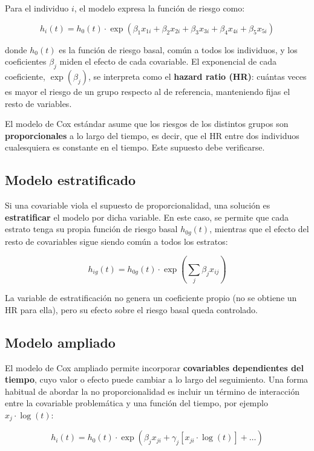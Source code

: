 \documentclass[
]{article}
\begin{document}
Para el individuo \(i\), el modelo expresa la función de riesgo como:

\[h_i(t) = h_0(t) \cdot \exp\left(\beta_1 x_{1i} + \beta_2 x_{2i} + \beta_3 x_{3i} + \beta_4 x_{4i} + \beta_5 x_{5i}\right)\]

donde \(h_0(t)\) es la función de riesgo basal, común a todos los
individuos, y los coeficientes \(\beta_j\) miden el efecto de cada
covariable. El exponencial de cada coeficiente, \(\exp(\beta_j)\), se
interpreta como el \textbf{hazard ratio (HR)}: cuántas veces es mayor el
riesgo de un grupo respecto al de referencia, manteniendo fijas el resto
de variables.

El modelo de Cox estándar asume que los riesgos de los distintos grupos
son \textbf{proporcionales} a lo largo del tiempo, es decir, que el HR
entre dos individuos cualesquiera es constante en el tiempo. Este
supuesto debe verificarse.

\hypertarget{modelo-estratificado}{%
\subsection{Modelo estratificado}\label{modelo-estratificado}}

Si una covariable viola el supuesto de proporcionalidad, una solución es
\textbf{estratificar} el modelo por dicha variable. En este caso, se
permite que cada estrato tenga su propia función de riesgo basal
\(h_{0g}(t)\), mientras que el efecto del resto de covariables sigue
siendo común a todos los estratos:

\[h_{ig}(t) = h_{0g}(t) \cdot \exp\left(\sum_j \beta_j x_{ij}\right)\]

La variable de estratificación no genera un coeficiente propio (no se
obtiene un HR para ella), pero su efecto sobre el riesgo basal queda
controlado.

\hypertarget{modelo-ampliado}{%
\subsection{Modelo ampliado}\label{modelo-ampliado}}

El modelo de Cox ampliado permite incorporar \textbf{covariables
dependientes del tiempo}, cuyo valor o efecto puede cambiar a lo largo
del seguimiento. Una forma habitual de abordar la no proporcionalidad es
incluir un término de interacción entre la covariable problemática y una
función del tiempo, por ejemplo \(x_j \cdot \log(t)\):

\[h_i(t) = h_0(t) \cdot \exp\left(\beta_j x_{ji} + \gamma_j \left[x_{ji} \cdot \log(t)\right] + \ldots\right)\]
\end{document}
